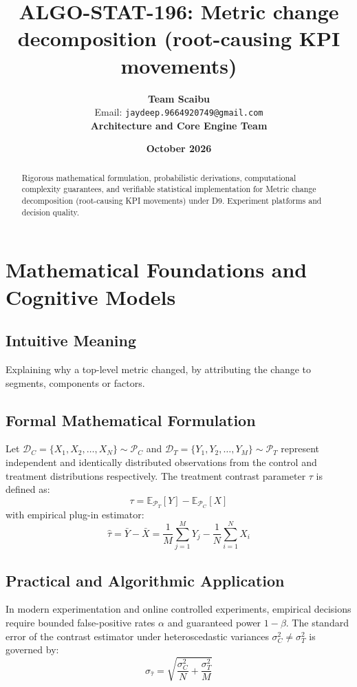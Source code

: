 \documentclass[11pt,a4paper]{article}
\title{\textbf{ALGO-STAT-196: Metric change decomposition (root-causing KPI movements)}}
\author{\textbf{Team Scaibu} \\ \small Email: \texttt{jaydeep.9664920749@gmail.com} \\ \small \textbf{Architecture and Core Engine Team}}
\date{\textbf{October 2026}}
\theoremstyle{definition}
\begin{document}
\maketitle

\begin{abstract}
Rigorous mathematical formulation, probabilistic derivations, computational complexity guarantees, and verifiable statistical implementation for Metric change decomposition (root-causing KPI movements) under D9. Experiment platforms and decision quality.
\end{abstract}

\section{Mathematical Foundations and Cognitive Models}

\subsection{Intuitive Meaning}
Explaining why a top-level metric changed, by attributing the change to segments, components or factors.

\subsection{Formal Mathematical Formulation}
Let $\mathcal{D}_C = \{X_1, X_2, \dots, X_N\} \sim \mathcal{P}_C$ and $\mathcal{D}_T = \{Y_1, Y_2, \dots, Y_M\} \sim \mathcal{P}_T$ represent independent and identically distributed observations from the control and treatment distributions respectively.
The treatment contrast parameter $\tau$ is defined as:
\begin{equation}
\tau = \mathbb{E}_{\mathcal{P}_T}[Y] - \mathbb{E}_{\mathcal{P}_C}[X]
\end{equation}
with empirical plug-in estimator:
\begin{equation}
\hat{\tau} = \bar{Y} - \bar{X} = \frac{1}{M} \sum_{j=1}^M Y_j - \frac{1}{N} \sum_{i=1}^N X_i
\end{equation}

\subsection{Practical and Algorithmic Application}
In modern experimentation and online controlled experiments, empirical decisions require bounded false-positive rates $\alpha$ and guaranteed power $1 - \beta$.
The standard error of the contrast estimator under heteroscedastic variances $\sigma_C^2 \neq \sigma_T^2$ is governed by:
\begin{equation}
\sigma_{\hat{\tau}} = \sqrt{\frac{\sigma_C^2}{N} + \frac{\sigma_T^2}{M}}
\end{equation}
\end{document}
